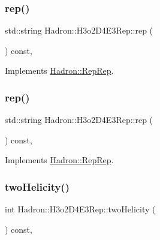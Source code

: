 \subsubsection{\texorpdfstring{rep()}{rep()}\hspace{0.1cm}{\footnotesize\ttfamily [4/5]}}
{\footnotesize\ttfamily std\+::string Hadron\+::\+H3o2\+D4\+E3\+Rep\+::rep (\begin{DoxyParamCaption}{ }\end{DoxyParamCaption}) const\hspace{0.3cm}{\ttfamily [inline]}, {\ttfamily [virtual]}}



Implements \mbox{\hyperlink{structHadron_1_1RepRep_ab3213025f6de249f7095892109575fde}{Hadron\+::\+Rep\+Rep}}.

\mbox{\label{structHadron_1_1H3o2D4E3Rep_ab7eff64255c6e04c36a08a7222b349ad}} 
\subsubsection{\texorpdfstring{rep()}{rep()}\hspace{0.1cm}{\footnotesize\ttfamily [5/5]}}
{\footnotesize\ttfamily std\+::string Hadron\+::\+H3o2\+D4\+E3\+Rep\+::rep (\begin{DoxyParamCaption}{ }\end{DoxyParamCaption}) const\hspace{0.3cm}{\ttfamily [inline]}, {\ttfamily [virtual]}}



Implements \mbox{\hyperlink{structHadron_1_1RepRep_ab3213025f6de249f7095892109575fde}{Hadron\+::\+Rep\+Rep}}.

\mbox{\label{structHadron_1_1H3o2D4E3Rep_a1d69cd4cfd1e5aa720df82ab77e8cc8e}} 
\subsubsection{\texorpdfstring{twoHelicity()}{twoHelicity()}\hspace{0.1cm}{\footnotesize\ttfamily [1/3]}}
{\footnotesize\ttfamily int Hadron\+::\+H3o2\+D4\+E3\+Rep\+::two\+Helicity (\begin{DoxyParamCaption}{ }\end{DoxyParamCaption}) const\hspace{0.3cm}{\ttfamily [inline]}, {\ttfamily [virtual]}}

